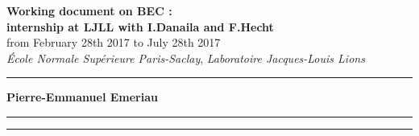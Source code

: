 \documentclass[10pt]{article}
\begin{document}
\begin{center}
\textbf{\Large Working document on BEC :}\\
\vspace*{15pt}
\textbf{\Large internship at LJLL with I.Danaila and F.Hecht} \\
\vspace*{15pt}
{\small from February 28th 2017 to July 28th 2017\\}
\vspace*{5pt}
\textit{\'Ecole Normale Supérieure Paris-Saclay}, \textit{Laboratoire Jacques-Louis Lions}\\
\end{center}

\begin{center}
\rule{12cm}{0.1pt}
\end{center}

\begin{center}
\textbf{Pierre-Emmanuel Emeriau}
\end{center}

\begin{center}
\rule{12cm}{0.1pt}
\end{center}

\hypersetup{
    linkcolor=black,  %
}

\tableofcontents

\hypersetup{
    linkcolor=cyan,  %
}

\begin{center}
\rule{12cm}{0.1pt}
\end{center}


\pagebreak





\end{document}

